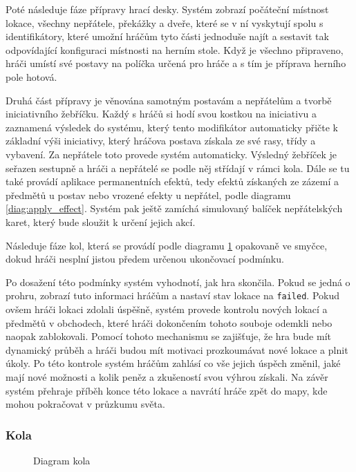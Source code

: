 Poté následuje fáze přípravy hrací desky. Systém zobrazí počáteční místnost lokace, všechny nepřátele, překážky a dveře, které se v ní vyskytují spolu s identifikátory, které umožní hráčům tyto části jednoduše najít a sestavit tak odpovídající konfiguraci místnosti na herním stole. Když je všechno připraveno, hráči umístí své postavy na políčka určená pro hráče a s tím je příprava herního pole hotová.

Druhá část přípravy je věnována samotným postavám a nepřátelům a tvorbě iniciativního žebříčku. Každý s hráčů si hodí svou kostkou na iniciativu a zaznamená výsledek do systému, který tento modifikátor automaticky přičte k základní výši iniciativy, který hráčova postava získala ze své rasy, třídy a vybavení. Za nepřátele toto provede systém automaticky. Výsledný žebříček je seřazen sestupně a hráči a nepřátelé se podle něj střídají v rámci kola. Dále se tu také provádí aplikace permanentních efektů, tedy efektů získaných ze zázemí a předmětů u postav nebo vrozené efekty u nepřátel, podle diagramu \ref{diag:apply_effect}. Systém pak ještě zamíchá simulovaný balíček nepřátelských karet, který bude sloužit k určení jejich akcí.

Následuje fáze kol, která se provádí podle diagramu \ref{diag:round} opakovaně ve smyčce, dokud hráči nesplní jistou předem určenou ukončovací podmínku.

Po dosažení této podmínky systém vyhodnotí, jak hra skončila. Pokud se jedná o prohru, zobrazí tuto informaci hráčům a nastaví stav lokace na \texttt{failed}. Pokud ovšem hráči lokaci zdolali úspěšně, systém provede kontrolu nových lokací a předmětů v obchodech, které hráči dokončením tohoto souboje odemkli nebo naopak zablokovali. Pomocí tohoto mechanismu se zajišťuje, že hra bude mít dynamický průběh a hráči budou mít motivaci prozkoumávat nové lokace a plnit úkoly. Po této kontrole systém hráčům zahlásí co vše jejich úspěch změnil, jaké mají nové možnosti a kolik peněz a zkušeností svou výhrou získali. Na závěr systém přehraje příběh konce této lokace a navrátí hráče zpět do mapy, kde mohou pokračovat v průzkumu světa.

\subsubsection*{Kola}
\label{subsubsec:rounds}

\begin{figure}[H]
    \centering
    \caption{Diagram kola}
    \label{diag:round}
\end{figure}

